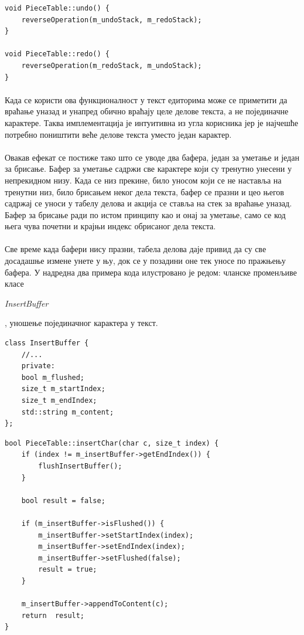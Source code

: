 \documentclass[12pt,oneside]{memoir}
\begin{document}
\begin{verbatim}
void PieceTable::undo() {
	reverseOperation(m_undoStack, m_redoStack);
}

void PieceTable::redo() {
	reverseOperation(m_redoStack, m_undoStack);
}
\end{verbatim}

\paragraph{}
Када се користи ова функционалност у текст едиторима може се приметити да 
враћање уназад и унапред обично враћају целе делове текста, а не појединачне
карактере. Таква имплементација је интуитивна из угла корисника јер је најчешће
потребно поништити веће делове текста уместо један карактер.

\paragraph{}
Овакав ефекат се постиже тако што се уводе два бафера, један за уметање и један
за брисање. Бафер за уметање садржи све карактере који су тренутно унесени у 
непрекидном низу. Када се низ прекине, било уносом који се не наставља на тренутни
низ, било брисањем неког дела текста, бафер се празни и цео његов садржај се уноси
у табелу делова и акција се ставља на стек за враћање уназад. 
Бафер за брисање ради по истом принципу као и онај за уметање, само се код њега
чува почетни и крајњи индекс обрисаног дела текста.

\paragraph{}
Све време када бафери нису празни, табела делова даје привид да су све досадашње
измене унете у њу, док се у позадини оне тек уносе по пражњењу бафера. У надредна
два примера кода илустровано је редом: чланске променљиве класе \begin{latinica}
\textit{InsertBuffer}\end{latinica}, уношење појединачног карактера у текст.

\begin{verbatim}
class InsertBuffer {
	//...
	private:
	bool m_flushed;
	size_t m_startIndex;
	size_t m_endIndex;
	std::string m_content;
};
\end{verbatim}

\begin{verbatim}
bool PieceTable::insertChar(char c, size_t index) {
	if (index != m_insertBuffer->getEndIndex()) {
		flushInsertBuffer();
	}
	
	bool result = false;
	
	if (m_insertBuffer->isFlushed()) {
		m_insertBuffer->setStartIndex(index);
		m_insertBuffer->setEndIndex(index);
		m_insertBuffer->setFlushed(false);
		result = true;
	}
	
	m_insertBuffer->appendToContent(c);
	return  result;
}
\end{verbatim}
\end{document}

